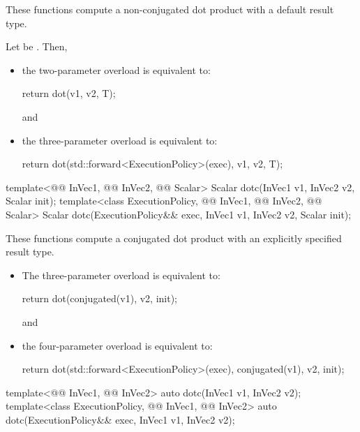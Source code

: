 \begin{itemdescr}
\pnum
These functions compute a non-conjugated dot product with a default result type.

\pnum
\effects
Let  be
.
Then,
\begin{itemize}
\item
the two-parameter overload is equivalent to:
\begin{codeblock}
return dot(v1, v2, T{});
\end{codeblock}
and
\item
the three-parameter overload is equivalent to:
\begin{codeblock}
return dot(std::forward<ExecutionPolicy>(exec), v1, v2, T{});
\end{codeblock}
\end{itemize}
\end{itemdescr}

%
\begin{itemdecl}
template<@@ InVec1, @@ InVec2, @@ Scalar>
  Scalar dotc(InVec1 v1, InVec2 v2, Scalar init);
template<class ExecutionPolicy, @@ InVec1, @@ InVec2, @@ Scalar>
  Scalar dotc(ExecutionPolicy&& exec,
              InVec1 v1, InVec2 v2, Scalar init);
\end{itemdecl}

\begin{itemdescr}

\pnum
These functions compute a conjugated dot product
with an explicitly specified result type.

\pnum
\effects
\begin{itemize}
\item
The three-parameter overload is equivalent to:
\begin{codeblock}
return dot(conjugated(v1), v2, init);
\end{codeblock}
and
\item
the four-parameter overload is equivalent to:
\begin{codeblock}
return dot(std::forward<ExecutionPolicy>(exec), conjugated(v1), v2, init);
\end{codeblock}
\end{itemize}
\end{itemdescr}

%
\begin{itemdecl}
template<@@ InVec1, @@ InVec2>
  auto dotc(InVec1 v1, InVec2 v2);
template<class ExecutionPolicy, @@ InVec1, @@ InVec2>
  auto dotc(ExecutionPolicy&& exec,
            InVec1 v1, InVec2 v2);
\end{itemdecl}

